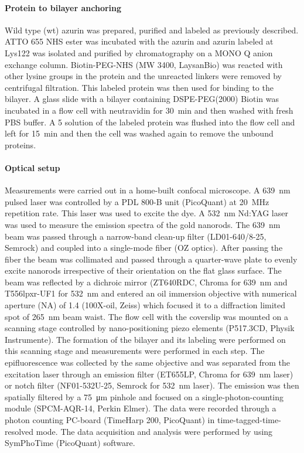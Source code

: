 \paragraph*{Protein to bilayer anchoring}
Wild type (wt) azurin was prepared, purified and labeled as previously described.\cite{VANDEKAMP1990283,nicolardi2012top-down}
ATTO 655 NHS ester was incubated with the azurin and azurin labeled at Lys122 was isolated and purified by chromatography on a MONO Q anion exchange column. 
Biotin-PEG-NHS (MW 3400, LaysanBio) was reacted with other lysine groups in the protein and the unreacted linkers were removed by centrifugal filtration.
This labeled protein was then used for binding to the bilayer.
A glass slide with a bilayer containing DSPE-PEG(2000) Biotin was incubated in a flow cell with neutravidin for \SI{30}{\minute} and then washed with fresh PBS buffer.
A \SI{5}{\nM} solution of the labeled protein was flushed into the flow cell and left for \SI{15}{\minute} and then the cell was washed again to remove the unbound proteins.


\paragraph*{Optical setup}
Measurements were carried out in a home-built confocal microscope.
A \SI{639}{\nm} pulsed laser was controlled by a PDL 800-B unit (PicoQuant) at \SI{20}{\MHz} repetition rate.
This laser was used to excite the dye.
A \SI{532}{\nm} Nd:YAG laser was used to measure the emission spectra of the gold nanorods.
The \SI{639}{\nm} beam was passed through a narrow-band clean-up filter (LD01-640/8-25, Semrock) and coupled into a single-mode fiber (OZ optics).
After passing the fiber the beam was collimated and passed through a quarter-wave plate to evenly excite nanorods irrespective of their orientation on the flat glass surface.
The beam was reflected by a dichroic mirror (ZT640RDC, Chroma for \SI{639}{\nm} and T556lpxr-UF1 for \SI{532}{\nm} and entered an oil immersion objective with numerical aperture (NA) of 1.4 (100X-oil, Zeiss) which focused it to a diffraction limited spot of \SI{265}{\nm} beam waist.
The flow cell with the coverslip was mounted on a scanning stage controlled by nano-positioning piezo elements (P517.3CD, Physik Instrumente).
The formation of the bilayer and its labeling were performed on this scanning stage and measurements were performed in each step.
The epifluorescence was collected by the same objective and was separated from the excitation laser through an emission filter (ET655LP, Chroma for \SI{639}{\nm} laser) or 
notch filter (NF01-532U-25, Semrock for \SI{532}{\nm} laser).
The emission was then spatially filtered by a \SI{75}{\um} pinhole and focused on a single-photon-counting module (SPCM-AQR-14, Perkin Elmer).
The data were recorded through a photon counting PC-board (TimeHarp 200, PicoQuant) in time-tagged-time-resolved mode.
The data acquisition and analysis were performed by using SymPhoTime (PicoQuant) software.


